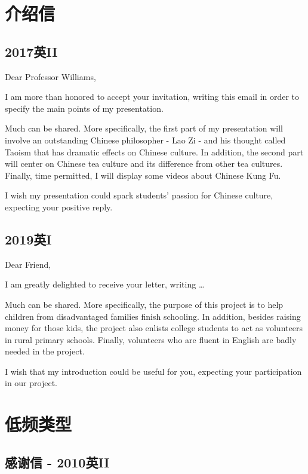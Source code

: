 \chapter{介绍信}

\section{2017英II}

\noindent Dear Professor Williams,

I am more than honored to accept your invitation, writing this email in order to specify the main 
points of my presentation. 

Much can be shared. More specifically, the first part of my presentation will involve an outstanding 
Chinese philosopher - Lao Zi - and his thought called Taoism that has dramatic effects on Chinese culture.
In addition, the second part will center on Chinese tea culture and its difference from other tea cultures.
Finally, time permitted, I will display some videos about Chinese Kung Fu.

I wish my presentation could spark students' passion for Chinese culture, 
expecting your positive reply.

\YSLM

\section{2019英I}

\noindent Dear Friend,

I am greatly delighted to receive your letter, writing \dots

Much can be shared. More specifically, the purpose of this project is to help
children from disadvantaged families finish schooling.
In addition, besides raising money for those kids, the project also enlists college 
students to act as volunteers in rural primary schools. 
Finally, volunteers who are fluent in English are badly needed in 
the project. 

I wish that my introduction could be useful for you, expecting your participation in our project.

\YSLM

\chapter{低频类型}

\section{感谢信 - 2010英II}

